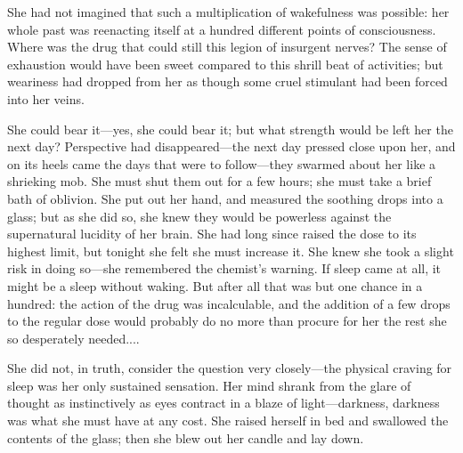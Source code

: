 \documentclass[12pt,a4paper]{book}
\begin{document}
She had not imagined that such a multiplication of wakefulness
was possible: her whole past was reenacting itself at a hundred
different points of consciousness. Where was the drug that could
still this legion of insurgent nerves? The sense of exhaustion
would have been sweet compared to this shrill beat of activities;
but weariness had dropped from her as though some cruel stimulant
had been forced into her veins.





She could bear it---yes, she could bear it; but what strength
would be left her the next day? Perspective had disappeared---the
next day pressed close upon her, and on its heels came the days
that were to follow---they swarmed about her like a shrieking mob. 
She must shut them out for a few hours; she must take a brief
bath of oblivion. She put out her hand, and measured the soothing
drops into a glass; but as she did so, she knew they would be
powerless against the supernatural lucidity of her brain. She had
long since raised the dose to its highest limit, but tonight she
felt she must increase it. She knew she took a slight risk in
doing so---she remembered the chemist's warning. If sleep came at
all, it might be a sleep without waking. But after all that was
but one chance in a hundred: the action of the drug was
incalculable, and the addition of a few drops to the regular dose
would probably do no more than procure for her the rest she so
desperately needed....





She did not, in truth, consider the question very closely---the
physical craving for sleep was her only sustained sensation. Her
mind shrank from the glare of thought as instinctively as eyes
contract in a blaze of light---darkness, darkness was what she
must have at any cost. She raised herself in bed and swallowed
the contents of the glass; then she blew out her candle and lay
down.
\end{document}
